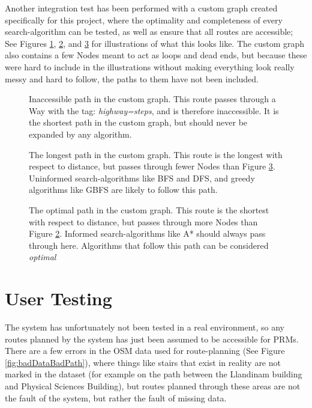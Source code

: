 Another integration test has been performed with a custom graph created specifically for this project, where the optimality and completeness of every search-algorithm can be tested, as well as ensure that all routes are accessible; See Figures \ref{fig:customInaccessible}, \ref{fig:customLongest}, and \ref{fig:customShortest} for illustrations of what this looks like. The custom graph also contains a few Nodes meant to act as loops and dead ends, but because these were hard to include in the illustrations without making everything look really messy and hard to follow, the paths to them have not been included.

\begin{figure}
	\centering
	\caption[Inaccessible path in the custom graph]{Inaccessible path in the custom graph. This route passes through a Way with the tag: \textit{highway=steps}, and is therefore inaccessible. It is the shortest path in the custom graph, but should never be expanded by any algorithm.}
	\label{fig:customInaccessible}
\end{figure}

\begin{figure}
	\centering
	\caption[Longest path in the custom graph]{The longest path in the custom graph. This route is the longest with respect to distance, but passes through fewer Nodes than Figure \ref{fig:customShortest}. Uninformed search-algorithms like BFS and DFS, and greedy algorithms like GBFS are likely to follow this path.}
	\label{fig:customLongest}
\end{figure}

\begin{figure}
	\centering
	\caption[Optimal path in the custom graph]{The optimal path in the custom graph. This route is the shortest with respect to distance, but passes through more Nodes than Figure \ref{fig:customLongest}. Informed search-algorithms like A* should always pass through here. Algorithms that follow this path can be considered \textit{optimal}}
	\label{fig:customShortest}
\end{figure}


\section{User Testing}
The system has unfortunately not been tested in a real environment, so any routes planned by the system has just been assumed to be accessible for PRMs. There are a few errors in the OSM data used for route-planning (See Figure \ref{fig:badDataBadPath}), where things like stairs that exist in reality are not marked in the dataset (for example on the path between the Llandinam building and Physical Sciences Building), but routes planned through these areas are not the fault of the system, but rather the fault of missing data.

